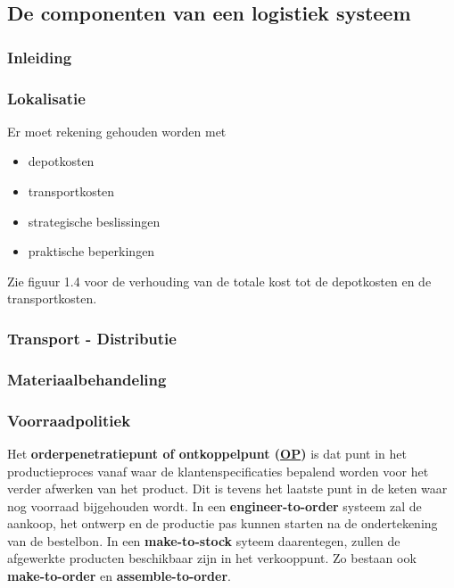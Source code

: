 \documentclass[12pt]{article}
\begin{document}
\subsection{De componenten van een logistiek systeem}
\subsubsection{Inleiding}
\subsubsection{Lokalisatie}
Er moet rekening gehouden worden met
\begin{itemize}
\item depotkosten
\item transportkosten
\item strategische beslissingen
\item praktische beperkingen
\end{itemize}
Zie figuur 1.4 voor de verhouding van de totale kost tot de depotkosten en de transportkosten.
\subsubsection{Transport - Distributie}
\subsubsection{Materiaalbehandeling}
\subsubsection{Voorraadpolitiek}
Het \textbf{orderpenetratiepunt of ontkoppelpunt (\href{http://knowyourmeme.com/memes/op-is-a-faggot}{OP})} is dat punt in het productieproces vanaf waar de klantenspecificaties bepalend worden voor het verder afwerken van het product. Dit is tevens het laatste punt in de keten waar nog voorraad bijgehouden wordt. In een \textbf{engineer-to-order} systeem zal de aankoop, het ontwerp en de productie pas kunnen starten na de ondertekening van de bestelbon. In een \textbf{make-to-stock} syteem daarentegen, zullen de afgewerkte producten beschikbaar zijn in het verkooppunt. Zo bestaan ook \textbf{make-to-order} en \textbf{assemble-to-order}.
\end{document}
